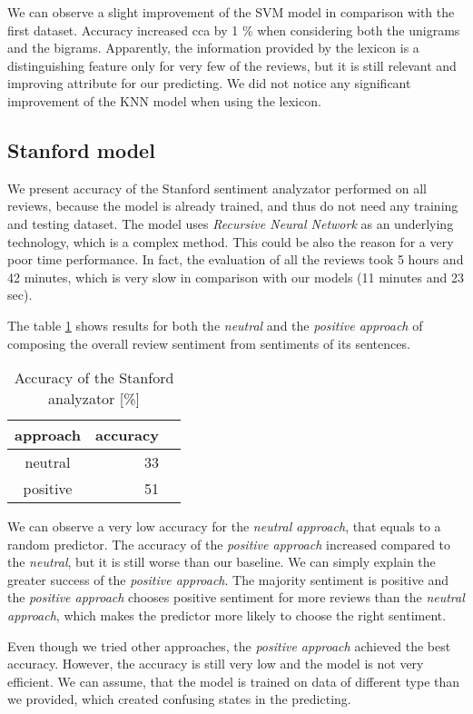 \documentclass{sig-alternate}
\begin{document}
We can observe a slight improvement of the SVM model in comparison with the first dataset.
Accuracy increased cca by 1 \% when considering both the unigrams and the bigrams.
Apparently, the information provided by the lexicon is a distinguishing feature only for very few of the reviews, but it is still relevant and improving attribute for our predicting.
We did not notice any significant improvement of the KNN model when using the lexicon.

\subsection{Stanford model}
We present accuracy of the Stanford sentiment analyzator performed on all reviews, because the model is already trained, and thus do not need any training and testing dataset.
The model uses {\it Recursive Neural Network} as an underlying technology, which is a complex method.
This could be also the reason for a very poor time performance.
In fact, the evaluation of all the reviews took 5 hours and 42 minutes, which is very slow in comparison with our models (11 minutes and 23 sec).

The table \ref{stanford} shows results for both the {\it neutral} and the {\it positive approach} of composing the overall review sentiment from sentiments of its sentences.

\begin{table}[h]
\centering
\caption{Accuracy of the Stanford analyzator [\%]}
\label{stanford}
\begin{tabular}{|c|r|r|} \hline
approach & accuracy  \\ \hline
neutral & 33 \\ \hline
positive & 51 \\ \hline
\end{tabular}
\end{table}

We can observe a very low accuracy for the {\it neutral approach}, that equals to a random predictor.
The accuracy of the {\it positive approach} increased compared to the {\it neutral}, but it is still worse than our baseline.
We can simply explain the greater success of the {\it positive approach}.
The majority sentiment is positive and the {\it positive approach} chooses positive sentiment for more reviews than the {\it neutral approach}, which makes the predictor more likely to choose the right sentiment.

Even though we tried other approaches, the {\it positive approach} achieved the best accuracy.
However, the accuracy is still very low and the model is not very efficient.
We can assume, that the model is trained on data of different type than we provided, which created confusing states in the predicting.
\end{document}
